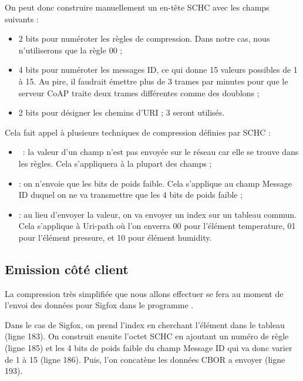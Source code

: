          \vspace{1em}

On peut donc construire manuellement un en-tête SCHC avec les champs suivants :
\begin{itemize}
\item 2 bits pour numéroter les règles de compression. Dans notre cas, nous n'utiliserons que la règle 00 ;
\item 4 bits pour numéroter les messages ID, ce qui donne 15 valeurs possibles de 1 à 15. Au pire, il faudrait émettre plus de 3 trames par minutes pour que le serveur CoAP traite deux trames différentes comme des doublons ;
\item 2 bits pour désigner les chemins d'URI ; 3 seront utilisés.
\end{itemize}

         \vspace{1em}

Cela fait appel à plusieurs techniques de compression définies par SCHC :
\begin{itemize}
\item \textit{}~: la valeur d'un champ n'est pas envoyée sur le réseau car elle se trouve dans les règles. Cela s'appliquera à la plupart des champs ;
\item \textit{} : on n'envoie que les bits de poids faible. Cela s'applique au champ Message ID duquel on ne va transmettre que les 4 bits de poids faible ;
\item \textit{} : au lieu d'envoyer la valeur, on va envoyer un index sur un tableau commun. Cela s'applique à Uri-path où l'on enverra 00 pour l'élément temperature, 01 pour l'élément pressure, et 10 pour élément humidity. 
\end{itemize}

         \vspace{1em}

\subsection{Emission côté client}

La compression très simplifiée que nous allons effectuer se fera au moment de l'envoi des données pour Sigfox dans le programme .


Dans le cas de Sigfox, on prend l'index en cherchant l'élément dans le tableau (ligne 183). On construit ensuite l'octet SCHC en ajoutant un numéro de règle (ligne 185) et les 4 bits de poids faible du champ Message ID qui va donc varier de 1 à 15 (ligne 186). Puis, l'on concatène les données CBOR a envoyer (ligne 193).

